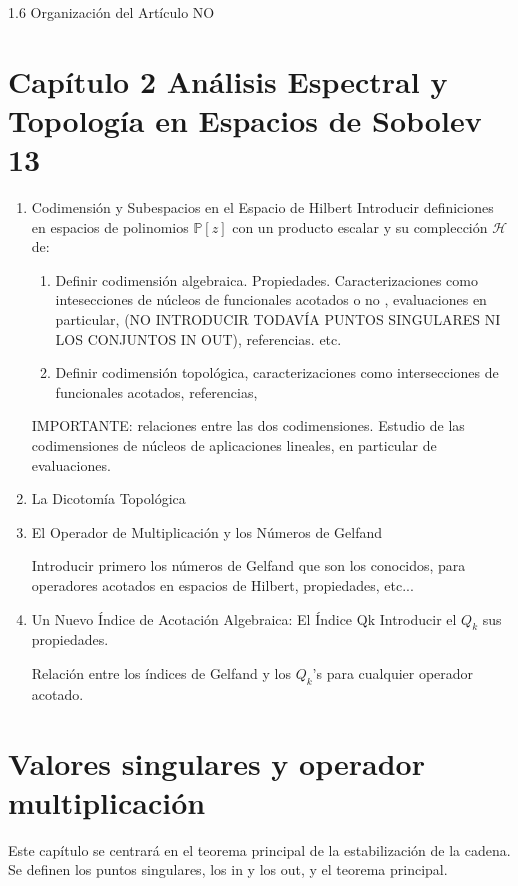 \documentclass[12pt,a4paper]{article}
\theoremstyle{definition}
\theoremstyle{remark}
\begin{document}
1.6 Organización del Artículo NO 

\section{Capítulo 2 Análisis Espectral y Topología en Espacios de Sobolev 13 }

\begin{enumerate}
    \item  Codimensión y Subespacios en el Espacio de Hilbert
\noindent Introducir definiciones en espacios de polinomios $\mathbb{P}[z]$ con un producto escalar  y su complección $\mathcal{H}$ de: 

\begin{enumerate}
    \item Definir codimensión algebraica. Propiedades. Caracterizaciones como intesecciones de núcleos de funcionales acotados o no , evaluaciones en particular, (NO INTRODUCIR TODAVÍA PUNTOS SINGULARES NI LOS CONJUNTOS IN OUT), referencias. etc. 
\item Definir codimensión topológica, caracterizaciones como intersecciones de funcionales acotados, referencias, 
\end{enumerate}

\noindent IMPORTANTE: relaciones entre las dos codimensiones.  
\noindent Estudio de las codimensiones de núcleos de aplicaciones lineales, en particular de evaluaciones. 

    \item La Dicotomía Topológica
\item El Operador de Multiplicación y los Números de Gelfand

\noindent Introducir primero los números de Gelfand que son los conocidos, para operadores acotados en espacios de Hilbert, propiedades, etc...
\item Un Nuevo Índice de Acotación Algebraica: El Índice Qk
\noindent Introducir el $Q_k$ sus propiedades. 

\noindent Relación entre los índices de Gelfand y los $Q_k$'s para cualquier operador acotado. 
\end{enumerate}

\section{Valores singulares y operador multiplicación }

\noindent Este capítulo se centrará en el teorema principal de la estabilización de la cadena. Se definen los puntos singulares, los in y los out, y el teorema principal. 
\end{document}
